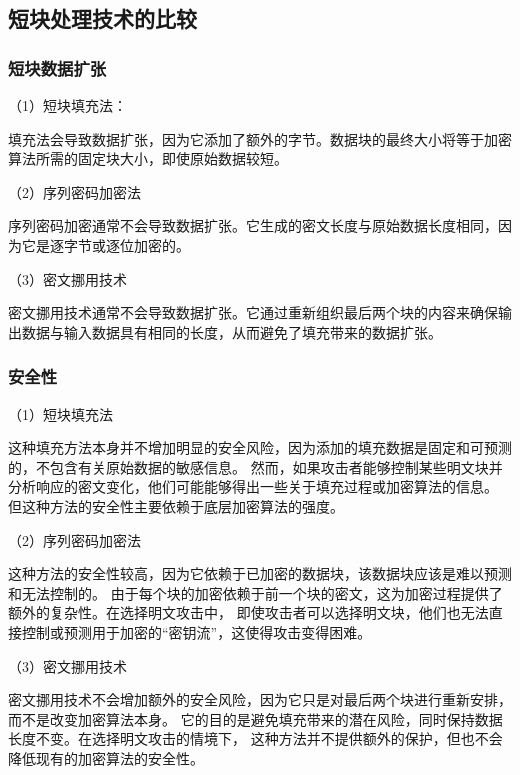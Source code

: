 \documentclass[a4paper,11pt,UTF8]{ctexart}
\begin{document}
    \subsection{短块处理技术的比较}
        \subsubsection{短块数据扩张}
            （1）短块填充法：\par
            填充法会导致数据扩张，因为它添加了额外的字节。数据块的最终大小将等于加密算法所需的固定块大小，即使原始数据较短。\par
            （2）序列密码加密法\par
            序列密码加密通常不会导致数据扩张。它生成的密文长度与原始数据长度相同，因为它是逐字节或逐位加密的。\par
            （3）密文挪用技术\par
            密文挪用技术通常不会导致数据扩张。它通过重新组织最后两个块的内容来确保输出数据与输入数据具有相同的长度，从而避免了填充带来的数据扩张。
        \subsubsection{安全性}

            （1）短块填充法\par
            这种填充方法本身并不增加明显的安全风险，因为添加的填充数据是固定和可预测的，不包含有关原始数据的敏感信息。
            然而，如果攻击者能够控制某些明文块并分析响应的密文变化，他们可能能够得出一些关于填充过程或加密算法的信息。
            但这种方法的安全性主要依赖于底层加密算法的强度。\par

            （2）序列密码加密法\par
            这种方法的安全性较高，因为它依赖于已加密的数据块，该数据块应该是难以预测和无法控制的。
            由于每个块的加密依赖于前一个块的密文，这为加密过程提供了额外的复杂性。在选择明文攻击中，
            即使攻击者可以选择明文块，他们也无法直接控制或预测用于加密的“密钥流”，这使得攻击变得困难。\par

            （3）密文挪用技术\par
            密文挪用技术不会增加额外的安全风险，因为它只是对最后两个块进行重新安排，而不是改变加密算法本身。
            它的目的是避免填充带来的潜在风险，同时保持数据长度不变。在选择明文攻击的情境下，
            这种方法并不提供额外的保护，但也不会降低现有的加密算法的安全性。\par
\end{document}
